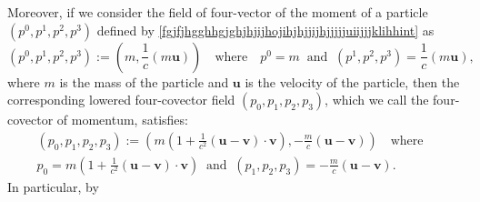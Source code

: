\documentclass{article}
\theoremstyle{definition}
\theoremstyle{remark}
\renewcommand{\vec}[1]{\mathbf{#1}}
\newcommand{\er}{\eqref}
\newcommand{\er}{\eqref}
\begin{document}
%
%
%
\begin{comment}
More generally, if for every speed-like vector field $\vec u$ and
every proper scalar field $\sigma$  we consider the four-vector
field $(b^0,b^1,b^2,b^3)$ on the group $\mathcal{S}_0$ defined by
\er{fgjfjhgghhgjghjhjijhojihjhjjijhjjjjjuiijjjklint} as:
\begin{equation}\label{fgjfjhgghhgjghjhjijhojihjhjjijhjjjjjuiijjjklhhhint}
(b^0,b^1,b^2,b^3):=\left(\sigma,\frac{\sigma}{c}\vec
u\right)\quad\text{where}\quad
b^0=\sigma\;\;\text{and}\;\;(b^1,b^2,b^3)=\frac{\sigma}{c}\vec u,
\end{equation}
then by \er{fgjfjhgghhgjghjhjkkkkgjghghuiiiulkkjKKyuyyuuuuiiuiiint}
the corresponding lowered four-covector field $(b_0,b_1,b_2,b_3)$
satisfies:
\begin{multline}\label{fgjfjhgghhgjghjhjijhojihjhjjijhjjjjjuiikkjjnjjbjint}
(b_0,b_1,b_2,b_3):=\left(\sigma\left(1+\frac{1}{c^2}\left(\vec
u-\vec v\right)\cdot\vec v\right),-\frac{\sigma}{c}\left(\vec u-\vec
v\right)\right)\quad\text{where}\quad\\
b_0=\sigma\left(1+\frac{1}{c^2}\left(\vec u-\vec v\right)\cdot\vec
v\right)\;\;\text{and}\;\;(b_1,b_2,b_3)=-\frac{\sigma}{c}\left(\vec
u-\vec v\right).
\end{multline}
In particular,
\end{comment}
%
%
%
Moreover, if we consider the field of four-vector of the moment of a
particle $(p^0,p^1,p^2,p^3)$ defined by
\er{fgjfjhgghhgjghjhjijhojihjhjjijhjjjjjuiijjjklihhint} as
\begin{equation}\label{fgjfjhgghhgjghjhjijhojihjhjjijhjjjjjuiijjjklihhjjjint}
(p^0,p^1,p^2,p^3):=\left(m,\frac{1}{c}(m\vec
u)\right)\quad\text{where}\quad
p^0=m\;\;\text{and}\;\;(p^1,p^2,p^3)=\frac{1}{c}(m\vec u),
\end{equation}
where $m$ is the mass of the particle and $\vec u$ is the velocity
of the particle, then the corresponding lowered four-covector field
$(p_0,p_1,p_2,p_3)$, which we call the four-covector of momentum,
satisfies:
\begin{multline}\label{fgjfjhgghhgjghjhjijhojihjhjjijhjjjjjuiikkjjnjjbjhjhint}
(p_0,p_1,p_2,p_3):=\left(m\left(1+\frac{1}{c^2}\left(\vec u-\vec
v\right)\cdot\vec v\right),-\frac{m}{c}\left(\vec u-\vec
v\right)\right)\quad\text{where}\quad\\
p_0=m\left(1+\frac{1}{c^2}\left(\vec u-\vec v\right)\cdot\vec
v\right)\;\;\text{and}\;\;(p_1,p_2,p_3)=-\frac{m}{c}\left(\vec
u-\vec v\right).
\end{multline}
In particular, by
\end{document}
